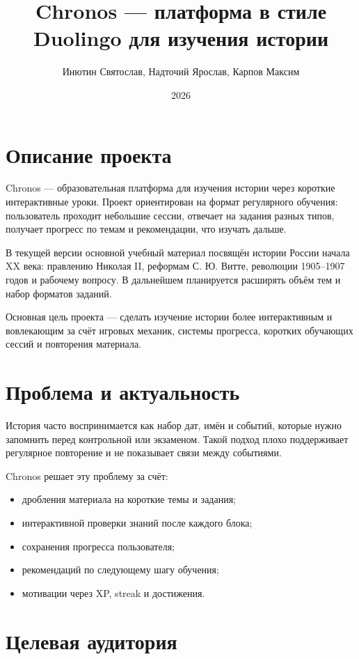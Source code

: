 \documentclass[12pt,a4paper]{article}
\title{Chronos --- платформа в стиле Duolingo для изучения истории}
\author{Инютин Святослав, Надточий Ярослав, Карпов Максим}
\date{2026}
\begin{document}
\maketitle

\section{Описание проекта}

Chronos --- образовательная платформа для изучения истории через короткие
интерактивные уроки. Проект ориентирован на формат регулярного обучения:
пользователь проходит небольшие сессии, отвечает на задания разных типов,
получает прогресс по темам и рекомендации, что изучать дальше.

В текущей версии основной учебный материал посвящён истории России начала
XX века: правлению Николая II, реформам С. Ю. Витте, революции 1905--1907 годов
и рабочему вопросу. В дальнейшем планируется расширять объём тем и набор
форматов заданий.

Основная цель проекта --- сделать изучение истории более интерактивным и
вовлекающим за счёт игровых механик, системы прогресса, коротких обучающих
сессий и повторения материала.

\section{Проблема и актуальность}

История часто воспринимается как набор дат, имён и событий, которые нужно
запомнить перед контрольной или экзаменом. Такой подход плохо поддерживает
регулярное повторение и не показывает связи между событиями.

Chronos решает эту проблему за счёт:

\begin{itemize}
    \item дробления материала на короткие темы и задания;
    \item интерактивной проверки знаний после каждого блока;
    \item сохранения прогресса пользователя;
    \item рекомендаций по следующему шагу обучения;
    \item мотивации через XP, streak и достижения.
\end{itemize}

\section{Целевая аудитория}
\end{document}
